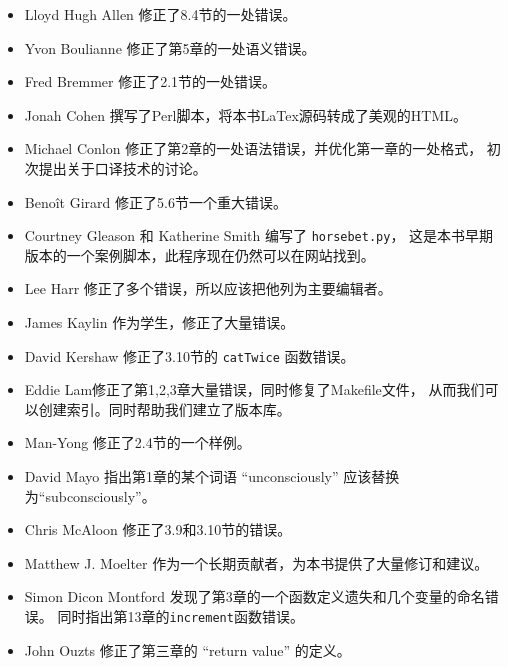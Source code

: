 \documentclass[10pt]{book}
\begin{document}
\begin{itemize}

\small
\item Lloyd Hugh Allen 修正了8.4节的一处错误。

\item Yvon Boulianne 修正了第5章的一处语义错误。

\item Fred Bremmer  修正了2.1节的一处错误。

\item Jonah Cohen 撰写了Perl脚本，将本书LaTex源码转成了美观的HTML。

\item Michael Conlon 修正了第2章的一处语法错误，并优化第一章的一处格式，
初次提出关于口译技术的讨论。

\item Beno\^{i}t Girard 修正了5.6节一个重大错误。

\item Courtney Gleason 和 Katherine Smith 编写了 {\tt horsebet.py}，
这是本书早期版本的一个案例脚本，此程序现在仍然可以在网站找到。

\item Lee Harr 修正了多个错误，所以应该把他列为主要编辑者。

\item James Kaylin 作为学生，修正了大量错误。

\item David Kershaw 修正了3.10节的 {\tt catTwice} 函数错误。

\item Eddie Lam修正了第1,2,3章大量错误，同时修复了Makefile文件，
从而我们可以创建索引。同时帮助我们建立了版本库。

\item Man-Yong 修正了2.4节的一个样例。

\item David Mayo 指出第1章的某个词语 “unconsciously”
应该替换为“subconsciously”。

\item Chris McAloon  修正了3.9和3.10节的错误。

\item Matthew J. Moelter 作为一个长期贡献者，为本书提供了大量修订和建议。

\item Simon Dicon Montford 发现了第3章的一个函数定义遗失和几个变量的命名错误。
同时指出第13章的{\tt increment}函数错误。

\item John Ouzts 修正了第三章的 “return value” 的定义。


\end{itemize}
\end{document}
